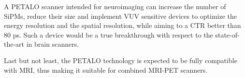 \documentclass[review]{elsarticle}
\begin{document}
A PETALO scanner intended for neuroimaging can increase the number of SiPMs, reduce their size and implement VUV sensitive devices to optimize the energy resolution and the spatial resolution, while aiming to a  CTR  better than 80 ps. Such a device would be a true breakthrough with respect to the state-of-the-art in brain scanners. 

Last but not least, the PETALO technology is expected to be fully compatible with MRI, thus making it suitable for combined MRI-PET scanners. 


\section*{}


\end{document}
